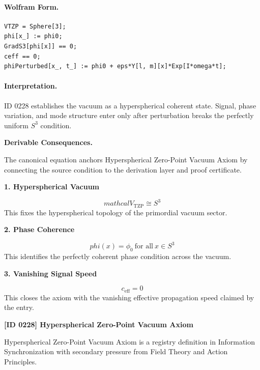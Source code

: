 \paragraph{Wolfram Form.}
\begin{verbatim}
VTZP = Sphere[3];
phi[x_] := phi0;
GradS3[phi[x]] == 0;
ceff == 0;
phiPerturbed[x_, t_] := phi0 + eps*Y[l, m][x]*Exp[I*omega*t];
\end{verbatim}

\paragraph{Interpretation.}

ID 0228 establishes the vacuum as a hyperspherical coherent state. Signal, phase variation, and mode structure enter only after perturbation breaks the perfectly uniform \(S^3\) condition.

\par\vspace{0.35em}
\noindent\textbf{Derivable Consequences.}\quad
\begingroup
\footnotesize
\raggedright
The canonical equation anchors Hyperspherical Zero-Point Vacuum Axiom by connecting the source condition to the derivation layer and proof certificate.
\par\endgroup

\noindent\textbf{1. Hyperspherical Vacuum}\par
\[
mathcal{V}_{\mathrm{TZP}} \cong S^3
\]
\noindent This fixes the hyperspherical topology of the primordial vacuum sector.\par
\noindent\textbf{2. Phase Coherence}\par
\[
phi(x)=\phi_0\ \text{for all}\ x\in S^3
\]
\noindent This identifies the perfectly coherent phase condition across the vacuum.\par
\noindent\textbf{3. Vanishing Signal Speed}\par
\[
c_{\mathrm{eff}} = 0
\]
\noindent This closes the axiom with the vanishing effective propagation speed claimed by the entry.\par

\clearpage
\noindent\textbf{[ID 0228] Hyperspherical Zero-Point Vacuum Axiom}\par
\vspace{0.35em}
\begingroup\small
{}
Hyperspherical Zero-Point Vacuum Axiom is a registry definition in Information Synchronization with secondary pressure from Field Theory and Action Principles.


